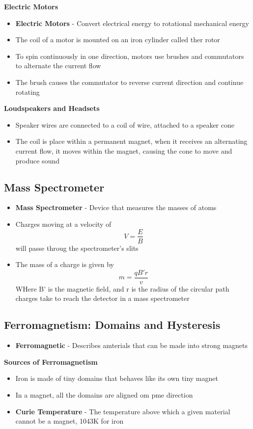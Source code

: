 \textbf{Electric Motors}
\begin{itemize}
    \item \textbf{Electric Motors} - Convert electrical energy to rotational mechanical energy
    \item The coil of a motor is mounted on an iron cylinder called ther rotor
    \item To spin continuously in one direction, motors use brushes and commutators to alternate the current flow
    \item The brush causes the commutator to reverse current direction and continue rotating
\end{itemize}

\textbf{Loudspeakers and Headsets}
\begin{itemize}
    \item Speaker wires are connected to a coil of wire, attached to a speaker cone
    \item The coil is place within a permanent magnet, when it receives an alternating current flow, it moves within the magnet, causing the cone to move and produce sound
\end{itemize}

\subsection{Mass Spectrometer}
\begin{itemize}
    \item \textbf{Mass Spectrometer} - Device that measures the masses of atoms
    \item Charges moving at a velocity of \[V=\frac{E}{B}\] will passe throug the spectrometer's slits 
    \item The mass of a charge is given by \[m=\frac{qB'r}{v}\] WHere B' is the magnetic field, and r is the radius of the circular path charges take to reach the detector in a mass spectrometer
\end{itemize}

\subsection{Ferromagnetism: Domains and Hysteresis}
\begin{itemize}
    \item \textbf{Ferromagnetic} - Describes amterials that can be made into strong magnets
\end{itemize}

\textbf{Sources of Ferromagnetism}
\begin{itemize}
    \item Iron is made of tiny domains that behaves like its own tiny magnet
    \item In a magnet, all the domains are aligned om pme direction
    \item \textbf{Curie Temperature} - The temperature above which a given material cannot be a magnet, 1043K for iron
\end{itemize}

